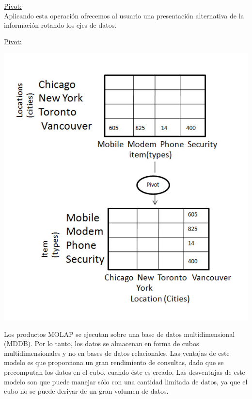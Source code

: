\documentclass{fancyslides}
\begin{document}
\begin{frame}
\misc
{
  \underline{Pivot:}\\
Aplicando esta operación ofrecemos al usuario una presentación alternativa de la información rotando los ejes de datos.
}
\end{frame}

\begin{frame}
\misc
{
  \underline{Pivot:}
  \begin{center}
  \includegraphics[scale=0.3]{pivot}
  \end{center}
}
\end{frame}

\begin{frame}
\end{frame}

\begin{frame}
\end{frame}

\begin{frame}
\misc
{
Los productos MOLAP se ejecutan sobre una base de datos multidimensional (MDDB).
Por lo tanto, los datos se almacenan en forma de cubos multidimensionales y no en bases de datos relacionales. Las ventajas de este modelo es que proporciona un
gran rendimiento de consultas, dado que se precomputan los datos en el cubo, cuando éste es creado. Las desventajas de este modelo son que puede manejar sólo con una cantidad limitada de datos, ya que el cubo no se puede derivar de un gran volumen de datos.
}
\end{frame}
\end{document}

